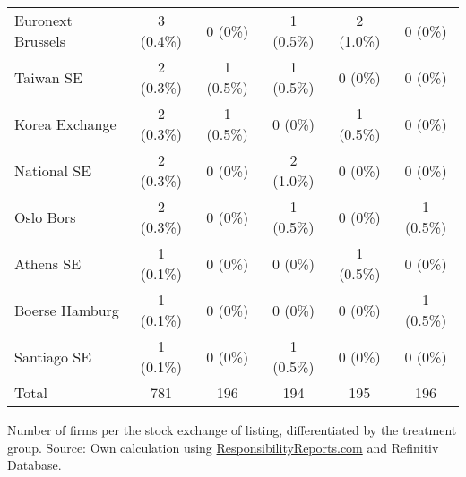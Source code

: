 \documentclass[12pt]{article}
\begin{document}
\begin{table}
\begin{tabular}{lccccc}
        Euronext Brussels & 3 (0.4\%) & 0 (0\%) & 1 (0.5\%) & 2 (1.0\%) & 0 (0\%)\\
        Taiwan SE & 2 (0.3\%) & 1 (0.5\%) & 1 (0.5\%) & 0 (0\%) & 0 (0\%)\\
        Korea Exchange & 2 (0.3\%) & 1 (0.5\%) & 0 (0\%) & 1 (0.5\%) & 0 (0\%)\\
        National SE & 2 (0.3\%) & 0 (0\%) & 2 (1.0\%) & 0 (0\%) & 0 (0\%)\\
        Oslo Bors & 2 (0.3\%) & 0 (0\%) & 1 (0.5\%) & 0 (0\%) & 1 (0.5\%)\\
        Athens SE & 1 (0.1\%) & 0 (0\%) & 0 (0\%) & 1 (0.5\%) & 0 (0\%)\\
        Boerse Hamburg & 1 (0.1\%) & 0 (0\%) & 0 (0\%) & 0 (0\%) & 1 (0.5\%)\\
        Santiago SE & 1 (0.1\%) & 0 (0\%) & 1 (0.5\%) & 0 (0\%) & 0 (0\%)\\
        \midrule
        Total &  781 & 196 & 194 & 195 & 196 \\
        \bottomrule
    \end{tabular}

    \vspace{0.2cm}

    \begin{tablenotes}
        \footnotesize
        \item Number of firms per the stock exchange of listing, differentiated by the treatment group. Source: Own calculation using \href{https://responsibilityreports.com}{ResponsibilityReports.com} and Refinitiv Database.
    \end{tablenotes}

\end{table}
\end{document}
